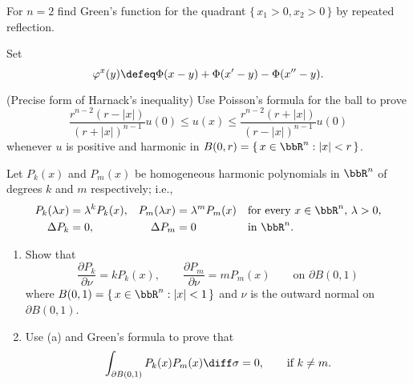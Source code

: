 \begin{problem}
  For \(n=2\) find Green's function for the quadrant
  \(\{\,x_1>0,x_2>0\,\}\) by repeated reflection.
\end{problem}
\begin{solution}
  Set
  \[
    \varphi^x(y)\defeq \Phi(x-y)+\Phi(x'-y)-\Phi(x''-y).
  \]
\end{solution}
\newpage

\begin{problem}
  (Precise form of Harnack's inequality) Use Poisson's formula for the ball
  to prove
  \[
    \frac{r^{n-2}(r-|x|)}{(r+|x|)^{n-1}}u(0)%
    \leq u(x)%
    \leq \frac{r^{n-2}(r+|x|)}{(r-|x|)^{n-1}}u(0)
  \]
  whenever \(u\) is positive and harmonic in
  \(B(0,r)=\{\,x\in\bbR^n:|x|<r\,\}\).
\end{problem}
\begin{solution}
\end{solution}
\newpage

\begin{problem}
  Let \(P_k(x)\) and \(P_m(x)\) be homogeneous harmonic polynomials in
  \(\bbR^n\) of degrees \(k\) and \(m\) respectively; i.e.,
  \begin{align*}
    P_k(\lambda x)&=\lambda^k P_k(x),&P_m(\lambda x)&=\lambda^m P_m(x)
    &&\text{for every \(x\in\bbR^n\), \(\lambda>0\),}\\
    \Delta P_k&=0,&\Delta P_m&=0&&\text{in \(\bbR^n\).}
  \end{align*}
  \begin{enumerate}[label=(\alph*),noitemsep]
  \item Show that
    \[
      \frac{\partial P_k}{\partial \nu}=kP_k(x),\qquad
      \frac{\partial P_m}{\partial\nu}=mP_m(x)\qquad\text{on \(\partial B(0,1)\)}
    \]
    where \(B(0,1)=\{\,x\in\bbR^n:|x|<1\,\}\) and \(\nu\) is the outward
    normal on \(\partial B(0,1)\).
  \item Use (a) and Green's formula to prove that
    \[
      \int_{\partial B(0,1)}P_k(x)P_m(x)\diff\sigma=0,\qquad\text{if
        \(k\neq m\).}
    \]
  \end{enumerate}
\end{problem}
\begin{solution}
\end{solution}

